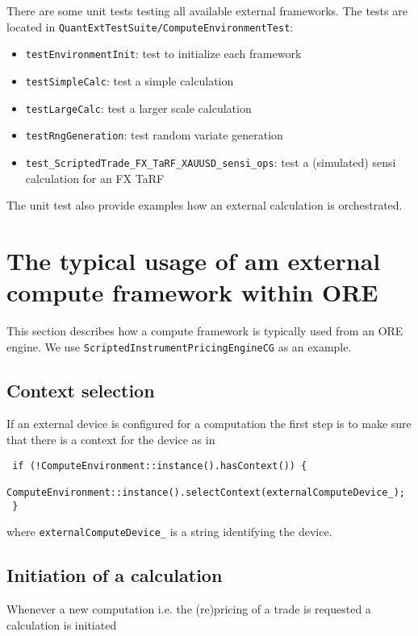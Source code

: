 \documentclass[12pt, a4paper]{article}
\begin{document}
There are some unit tests testing all available external frameworks. The tests are located in
\verb+QuantExtTestSuite/ComputeEnvironmentTest+:

\begin{itemize}
  \item \verb+testEnvironmentInit+: test to initialize each framework
  \item \verb+testSimpleCalc+: test a simple calculation
  \item \verb+testLargeCalc+: test a larger scale calculation
  \item \verb+testRngGeneration+: test random variate generation
  \item \verb+test_ScriptedTrade_FX_TaRF_XAUUSD_sensi_ops+: test a (simulated) sensi calculation for an FX TaRF
\end{itemize}

The unit test also provide examples how an external calculation is orchestrated.

\section{The typical usage of am external compute framework within ORE}\label{usageFromORE}

This section describes how a compute framework is typically used from an ORE engine. We use
\verb+ScriptedInstrumentPricingEngineCG+ as an example.


\subsection{Context selection}

If an external device is configured for a computation the first step is to make sure that there is a context for the
device as in

\begin{verbatim}
 if (!ComputeEnvironment::instance().hasContext()) {
     ComputeEnvironment::instance().selectContext(externalComputeDevice_);
 }
\end{verbatim}

where \verb+externalComputeDevice_+ is a string identifying the device.

\subsection{Initiation of a calculation}

Whenever a new computation i.e. the (re)pricing of a trade is requested a calculation is initiated
\end{document}
